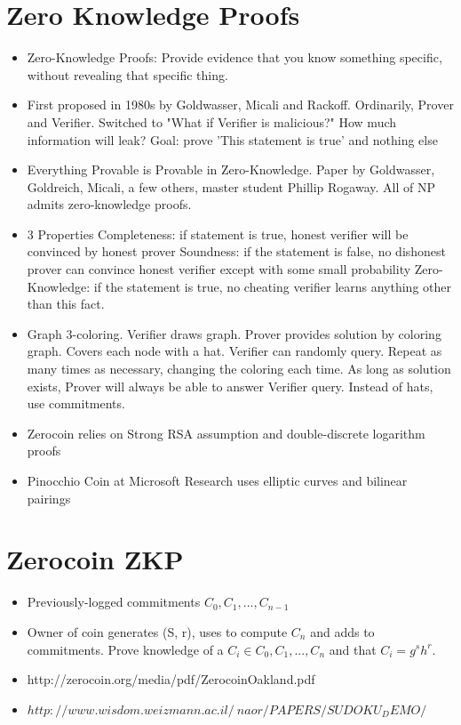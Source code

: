 \documentclass{article}
\begin{document}
\section{Zero Knowledge Proofs}
\begin{itemize}
\item Zero-Knowledge Proofs: Provide evidence that you know something specific, without revealing that specific thing.
\item First proposed in 1980s by Goldwasser, Micali and Rackoff. Ordinarily, Prover and Verifier. Switched to "What if Verifier is malicious?" How much information will leak? Goal: prove 'This statement is true' and nothing else
\item Everything Provable is Provable in Zero-Knowledge. Paper by Goldwasser, Goldreich, Micali, a few others, master student Phillip Rogaway. All of NP admits zero-knowledge proofs.
\item 3 Properties
\subitem Completeness: if statement is true, honest verifier will be convinced by honest prover
\subitem Soundness: if the statement is false, no dishonest prover can convince honest verifier except with some small probability
\subitem Zero-Knowledge: if the statement is true, no cheating verifier learns anything other than this fact.
\item Graph 3-coloring. Verifier draws graph. Prover provides solution by coloring graph. Covers each node with a hat. Verifier can randomly query. Repeat as many times as necessary, changing the coloring each time. As long as solution exists, Prover will always be able to answer Verifier query.
\subitem Instead of hats, use commitments. 
\item Zerocoin relies on Strong RSA assumption and double-discrete logarithm proofs
\item Pinocchio Coin at Microsoft Research uses elliptic curves and bilinear pairings
\end{itemize}

\section{Zerocoin ZKP}
\begin{itemize}
\item Previously-logged commitments $C_0, C_1, ..., C_{n-1}$
\item Owner of coin generates (S, r), uses to compute $C_n$ and adds to commitments. Prove knowledge of a $C_i \in C_0, C_1, ..., C_n$ and that $C_i = g^s h^r$.
\item http://zerocoin.org/media/pdf/ZerocoinOakland.pdf
\item $http://www.wisdom.weizmann.ac.il/~naor/PAPERS/SUDOKU_DEMO/$
\end{itemize}
\end{document}
